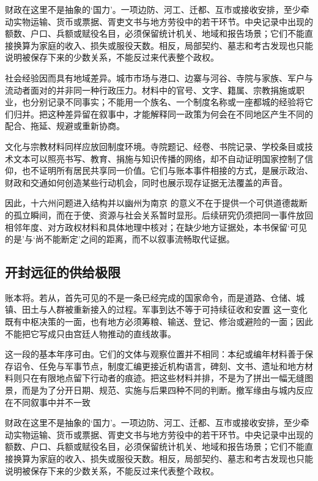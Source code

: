 财政在这里不是抽象的‘国力’。一项边防、河工、迁都、互市或接收安排，至少牵动实物运输、货币或票据、胥吏文书与地方劳役中的若干环节。中央记录中出现的额数、户口、兵额或赋役名目，必须保留统计机关、地域和报告场景；它们不能直接换算为家庭的收入、损失或服役天数。相反，局部契约、墓志和考古发现也只能说明被保存下来的少数关系，不能反过来代表整个政权。

社会经验因而具有地域差异。城市市场与港口、边寨与河谷、寺院与家族、军户与流动者面对的并非同一种行政压力。材料中的官号、文字、籍属、宗教捐施或职业，也分别记录不同事实；不能用一个族名、一个制度名称或一座都城的经验将它们归并。把这种差异留在叙事中，才能解释同一政策为何会在不同地区产生不同的配合、拖延、规避或重新协商。

文化与宗教材料同样应放回制度环境。寺院题记、经卷、书院记录、学校条目或技术文本可以照亮书写、教育、捐施与知识传播的网络，却不自动证明国家控制了信仰，也不证明所有居民共享同一价值。它们与账本事件相接的方式，是展示政治、财政和交通如何创造某些行动机会，同时也展示现存证据无法覆盖的声音。

因此，十六州问题进入结构并以幽州为南京 的意义不在于提供一个可供道德裁断的孤立瞬间，而在于使、资源与社会关系暂时显形。后续研究仍须把同一事件放回相邻年度、对方政权材料和具体地理中核对；在缺少地方证据处，本书保留‘可见的是’与‘尚不能断定’之间的距离，而不以叙事流畅取代证据。

\subsection{开封远征的供给极限}

账本将。若从，首先可见的不是一条已经完成的国家命令，而是道路、仓储、城镇、田土与人群被重新接入的过程。军事到达不等于可持续征收和安置 这一变化既有中枢决策的一面，也有地方必须筹粮、输送、登记、修治或避险的一面；因此不能把它写成只由宫廷人物推动的直线故事。

这一段的基本年序可由。它们的文体与观察位置并不相同：本纪或编年材料善于保存诏令、任免与军事节点，制度汇编更接近机构语言，碑刻、文书、遗址和地方材料则只在有限地点留下行动者的痕迹。把这些材料并排，不是为了拼出一幅无缝图景，而是为了分开日期、规范、实施与后果四种不同的判断。撤军缘由与城内反应在不同叙事中并不一致

财政在这里不是抽象的‘国力’。一项边防、河工、迁都、互市或接收安排，至少牵动实物运输、货币或票据、胥吏文书与地方劳役中的若干环节。中央记录中出现的额数、户口、兵额或赋役名目，必须保留统计机关、地域和报告场景；它们不能直接换算为家庭的收入、损失或服役天数。相反，局部契约、墓志和考古发现也只能说明被保存下来的少数关系，不能反过来代表整个政权。

